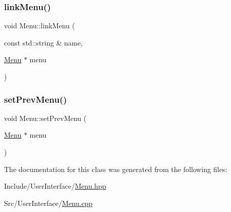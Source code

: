 \mbox{\label{class_menu_a652cad89bd210ee73ced43f27c94ad26}} 
\subsubsection{\texorpdfstring{linkMenu()}{linkMenu()}}
{\footnotesize\ttfamily void Menu\+::link\+Menu (\begin{DoxyParamCaption}\item[{const std\+::string \&}]{name,  }\item[{\mbox{\hyperlink{class_menu}{Menu}} $\ast$}]{menu }\end{DoxyParamCaption})}

\mbox{\label{class_menu_a1b31b024f1504e95e883164895929084}} 
\subsubsection{\texorpdfstring{setPrevMenu()}{setPrevMenu()}}
{\footnotesize\ttfamily void Menu\+::set\+Prev\+Menu (\begin{DoxyParamCaption}\item[{\mbox{\hyperlink{class_menu}{Menu}} $\ast$}]{menu }\end{DoxyParamCaption})}



The documentation for this class was generated from the following files\+:\begin{DoxyCompactItemize}
\item 
Include/\+User\+Interface/\mbox{\hyperlink{_menu_8hpp}{Menu.\+hpp}}\item 
Src/\+User\+Interface/\mbox{\hyperlink{_menu_8cpp}{Menu.\+cpp}}\end{DoxyCompactItemize}
